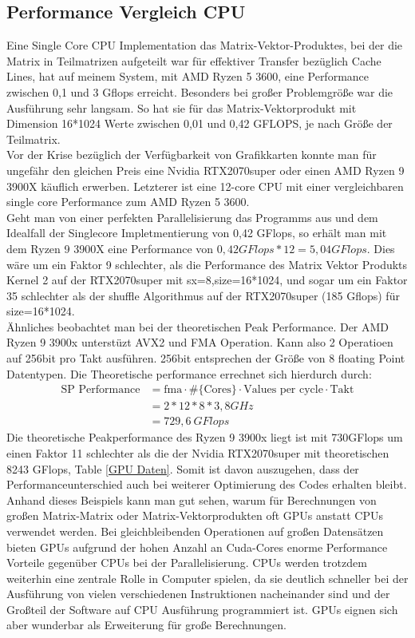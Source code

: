 \documentclass[10pt,a4paper]{article}
\begin{document}
	  \subsection{Performance Vergleich CPU}
	  Eine Single Core CPU Implementation das Matrix-Vektor-Produktes, bei der die Matrix in Teilmatrizen aufgeteilt war für effektiver Transfer bezüglich Cache Lines, hat auf meinem System, mit AMD Ryzen 5 3600, eine Performance zwischen 0,1 und 3 Gflops erreicht. Besonders bei großer Problemgröße war die Ausführung sehr langsam. So hat sie für das Matrix-Vektorprodukt mit Dimension 16*1024 Werte zwischen 0,01 und 0,42 GFLOPS, je nach Größe der Teilmatrix.\\ 
	  Vor der Krise bezüglich der Verfügbarkeit von Grafikkarten konnte man für ungefähr den gleichen Preis eine Nvidia RTX2070super oder einen AMD Ryzen 9 3900X käuflich erwerben. Letzterer ist eine 12-core CPU mit einer vergleichbaren single core Performance zum AMD Ryzen 5 3600. \\
	  Geht man von einer perfekten Parallelisierung das Programms aus und dem Idealfall der Singlecore Impletmentierung von 0,42 GFlops, so erhält man mit dem Ryzen 9 3900X eine Performance von $0,42GFlops*12=5,04 GFlops$. Dies wäre um ein Faktor 9 schlechter, als die Performance des Matrix Vektor Produkts Kernel 2 auf der RTX2070super mit sx=8,size=16*1024, und sogar um ein Faktor 35 schlechter als der shuffle Algorithmus auf der RTX2070super (185 Gflops) für size=16*1024.\\
	  Ähnliches beobachtet man bei der theoretischen Peak Performance. Der AMD Ryzen 9 3900x  unterstüzt AVX2 und FMA Operation. Kann also 2 Operatioen auf 256bit pro Takt ausführen. 256bit entsprechen der Größe von 8 floating Point Datentypen. Die Theoretische performance errechnet sich hierdurch durch:
	  \begin{align*}
	  	\text{SP Performance}&=\text{fma}\cdot \#\{\text{Cores}\}\cdot\text{Values per cycle}\cdot \text{Takt}\\
	  	&=2*12*8*3,8GHz\\
	  	&=729,6\ GFlops
	  \end{align*}
	  Die theoretische Peakperformance des Ryzen 9 3900x liegt ist mit 730GFlops um einen Faktor 11 schlechter als die der Nvidia RTX2070super mit theoretischen 8243 GFlops, Table \ref{GPU Daten}. Somit ist davon auszugehen, dass der Performanceunterschied auch bei weiterer Optimierung des Codes erhalten bleibt. \\ 
	   Anhand dieses Beispiels kann man gut sehen, warum für Berechnungen von großen Matrix-Matrix oder Matrix-Vektorprodukten oft GPUs anstatt CPUs verwendet werden. Bei gleichbleibenden Operationen auf großen Datensätzen bieten GPUs aufgrund der hohen Anzahl an Cuda-Cores enorme Performance Vorteile gegenüber CPUs bei der Parallelisierung. CPUs werden trotzdem weiterhin eine zentrale Rolle in Computer spielen, da sie deutlich schneller bei der Ausführung von vielen verschiedenen Instruktionen nacheinander sind und der Großteil der Software auf CPU Ausführung programmiert ist. GPUs eignen sich aber wunderbar als Erweiterung für große Berechnungen.
\end{document}
